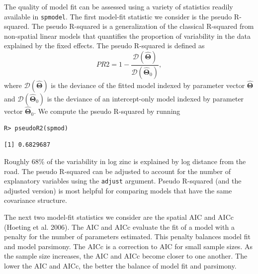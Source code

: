 \documentclass{article}
\begin{document}
The quality of model fit can be assessed using a variety of statistics
readily available in \texttt{spmodel}. The first model-fit statistic we
consider is the pseudo R-squared. The pseudo R-squared is a
generalization of the classical R-squared from non-spatial linear models
that quantifies the proportion of variability in the data explained by
the fixed effects. The pseudo R-squared is defined as \begin{equation*}
PR2 = 1 - \frac{\mathcal{D}(\boldsymbol{\hat{\Theta}})}{\mathcal{D}(\boldsymbol{\hat{\Theta}}_0)},
\end{equation*} where \(\mathcal{D}(\boldsymbol{\hat{\Theta}})\) is the
deviance of the fitted model indexed by parameter vector
\(\boldsymbol{\hat{\Theta}}\) and
\(\mathcal{D}(\boldsymbol{\hat{\Theta}}_0)\) is the deviance of an
intercept-only model indexed by parameter vector
\(\boldsymbol{\hat{\Theta}}_0\). We compute the pseudo R-squared by
running

\begin{verbatim}
R> pseudoR2(spmod)
\end{verbatim}

\begin{verbatim}
[1] 0.6829687
\end{verbatim}

Roughly 68\% of the variability in log zinc is explained by log distance
from the road. The pseudo R-squared can be adjusted to account for the
number of explanatory variables using the \texttt{adjust} argument.
Pseudo R-squared (and the adjusted version) is most helpful for
comparing models that have the same covariance structure.

The next two model-fit statistics we consider are the spatial AIC and
AICc (Hoeting et al. 2006). The AIC and AICc evaluate the fit of a model
with a penalty for the number of parameters estimated. This penalty
balances model fit and model parsimony. The AICc is a correction to AIC
for small sample sizes. As the sample size increases, the AIC and AICc
become closer to one another. The lower the AIC and AICc, the better the
balance of model fit and parsimony.
\end{document}
